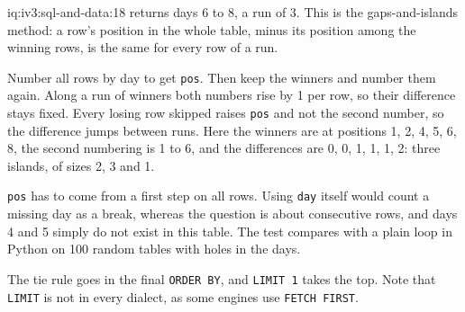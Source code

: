 \begin{solution}{iq:iv3:sql-and-data:18}
 returns days 6 to 8, a run of 3. This is the gaps-and-islands method: a row's position in the whole table, minus its position among the winning rows, is the same for every row of a run.
\label{lst:iv3:sq:islands}

Number all rows by day to get \texttt{pos}. Then keep the winners and number them again. Along a run of winners both numbers rise by 1 per row, so their difference stays fixed. Every losing row skipped raises \texttt{pos} and not the second number, so the difference jumps between runs. Here the winners are at positions 1, 2, 4, 5, 6, 8, the second numbering is 1 to 6, and the differences are 0, 0, 1, 1, 1, 2: three islands, of sizes 2, 3 and 1.

\texttt{pos} has to come from a first step on all rows. Using \texttt{day} itself would count a missing day as a break, whereas the question is about consecutive rows, and days 4 and 5 simply do not exist in this table. The test compares with a plain loop in Python on 100 random tables with holes in the days.

The tie rule goes in the final \texttt{ORDER BY}, and \texttt{LIMIT 1} takes the top. Note that \texttt{LIMIT} is not in every dialect, as some engines use \texttt{FETCH FIRST}.

\end{solution}

